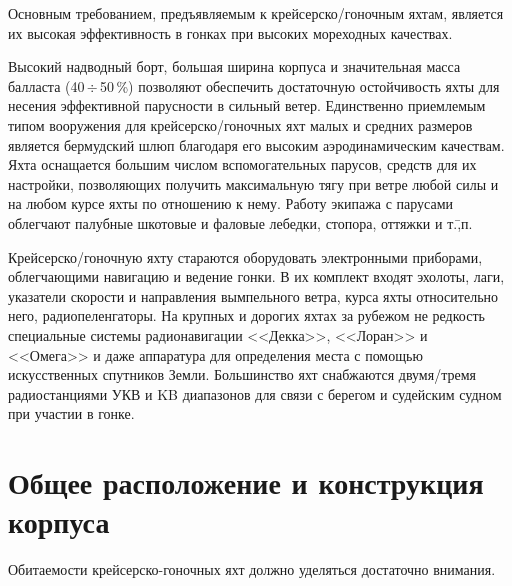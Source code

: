 \documentclass[a4paper, 12pt, twoside, final, book, russian, fittopage, cyremdash]{ncc}
\newcommand{\otdo}{\,\ensuremath{\div}\,}
\begin{document}
Основным требованием, предъявляемым к крейсерско\-/гоночным яхтам, является их высокая эффективность в гонках при высоких мореходных качествах. 

Высокий надводный борт, большая ширина корпуса и значительная масса балласта (40\otdo 50\,\%) позволяют обеспечить достаточную остойчивость яхты для несения эффективной парусности в сильный ветер. Единственно приемлемым типом вооружения для крейсерско\-/гоночных яхт малых и средних размеров является бермудский шлюп благодаря его высоким аэродинамическим качествам. Яхта оснащается большим числом вспомогательных парусов, средств для их настройки, позволяющих получить максимальную тягу при ветре любой силы и на любом курсе яхты по отношению к нему. Работу экипажа с парусами облегчают палубные шкотовые и фаловые лебедки, стопора, оттяжки и т.\=,п. 

Крейсерско\-/гоночную яхту стараются оборудовать электронными приборами, облегчающими навигацию и ведение гонки. В их комплект входят эхолоты, лаги, указатели скорости и направления вымпельного ветра, курса яхты относительно него, радиопеленгаторы. На крупных и дорогих яхтах за рубежом не редкость специальные системы радионавигации <<Декка>>, <<Лоран>> и <<Омега>> и даже аппаратура для определения места с помощью искусственных спутников Земли. Большинство яхт снабжаются двумя\-/тремя радиостанциями УКВ и KB диапазонов для связи с берегом и судейским судном при участии в гонке. 

\section{Общее расположение и конструкция корпуса}

Обитаемости крейсерско-гоночных яхт должно уделяться достаточно внимания.
\end{document}
